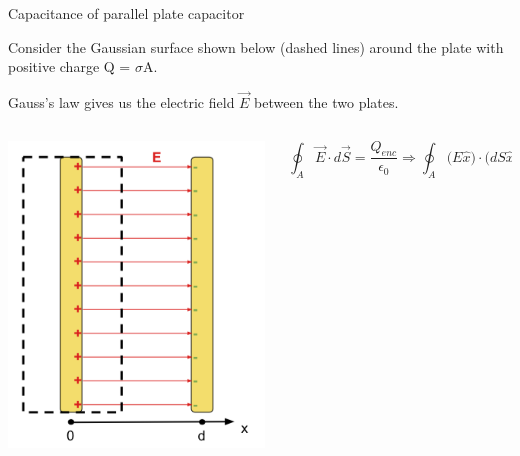 %
%
%

\begin{frame}{Capacitance of parallel plate capacitor}

Consider the Gaussian surface shown below (dashed lines) around the plate with positive charge Q = $\sigma$A.\\
\vspace{0.1cm}

Gauss's law gives us the electric field $\vec{E}$ between the two plates.\\
\vspace{0.2cm}

\begin{columns}
  \begin{column}{0.30\textwidth}
   \begin{center}
     \includegraphics[width=0.99\textwidth]{./images/schematics/parallel_plate_capacitor_gaussian_surface.png}\\
   \end{center}
  \end{column}
  \begin{column}{0.70\textwidth}
     \begin{equation*}
       \oint_{A} \vec{E} \cdot d\vec{S} = \frac{Q_{enc}}{\epsilon_0} \Rightarrow
       \oint_{A} \big( E \hat{x} \big) \cdot \big( dS \hat{x} \big) = \frac{\sigma A}{\epsilon_0} \Rightarrow
     \end{equation*}


\end{column}
\end{columns}
\end{frame}
